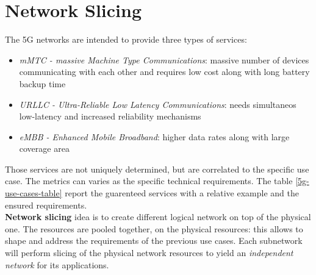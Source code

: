 \documentclass[10pt,a4paper]{report}
\theoremstyle{definition}
\begin{document}
\section{Network Slicing}\label{sec:network-slicing}
The 5G networks are intended to provide three types of services:
\begin{itemize}
	\item 
	\textit{mMTC - massive Machine Type Communications}: massive number of devices communicating with each other and requires low cost along with long battery backup time
	\item 
	\textit{URLLC - Ultra-Reliable Low Latency Communications}: needs simultaneos low-latency and increased reliability mechanisms
	\item 
	\textit{eMBB - Enhanced Mobile Broadband}: higher data rates along with large coverage area
\end{itemize}

Those services are not uniquely determined, but are correlated to the specific use case. The metrics can varies as the specific technical requirements. The table \ref{5g-use-cases-table} report the guarenteed services with a relative example and the ensured requirements. \\
\textbf{Network slicing} idea is to create different logical network on top of the physical one. The resources are pooled together, on the physical resources: this allows to shape and address the requirements of the previous use cases.
Each subnetwork will perform slicing of the physical network resources to yield an \textit{independent network} for its applications.
\end{document}
